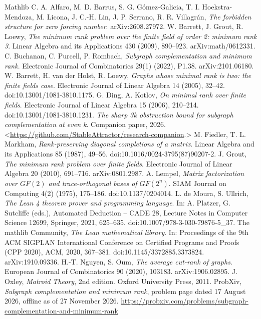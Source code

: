 \documentclass[11pt,letterpaper,reqno]{amsart}
\theoremstyle{spaced}
\begin{document}
\begin{thebibliography}{Mathlib}
\footnotesize\linespread{1}\selectfont\setlength{\itemsep}{0pt}\setlength{\parskip}{0pt}
 C. A. Alfaro, M. D. Barrus, S. G. Gómez-Galicia, T. I. Hoekstra-Mendoza, M. Licona, J. C.-H. Lin, J. P. Serrano, R. R. Villagrán, \emph{The forbidden structure for zero forcing number}. arXiv:2608.27972.
 W. Barrett, J. Grout, R. Loewy, \emph{The minimum rank problem over the finite field of order 2: minimum rank 3}. Linear Algebra and its Applications 430 (2009), 890--923. arXiv:math/0612331.
 C. Buchanan, C. Purcell, P. Rombach, \emph{Subgraph complementation and minimum rank}. Electronic Journal of Combinatorics 29(1) (2022), P1.38. arXiv:2101.06180.
 W. Barrett, H. van der Holst, R. Loewy, \emph{Graphs whose minimal rank is two: the finite fields case}. Electronic Journal of Linear Algebra 14 (2005), 32--42. doi:10.13001/1081-3810.1175.
 G. Ding, A. Kotlov, \emph{On minimal rank over finite fields}. Electronic Journal of Linear Algebra 15 (2006), 210--214. doi:10.13001/1081-3810.1231.
 \emph{The sharp 3k obstruction bound for subgraph complementation at even k}. Companion paper, 2026. \textless{}\url{https://github.com/StableAttractor/research-companion}.\textgreater{}
 M. Fiedler, T. L. Markham, \emph{Rank-preserving diagonal completions of a matrix}. Linear Algebra and its Applications 85 (1987), 49--56. doi:10.1016/0024-3795(87)90207-2.
 J. Grout, \emph{The minimum rank problem over finite fields}. Electronic Journal of Linear Algebra 20 (2010), 691--716. arXiv:0801.2987.
 A. Lempel, \emph{Matrix factorization over \(GF(2)\) and trace-orthogonal bases of \(GF(2^n)\)}. SIAM Journal on Computing 4(2) (1975), 175--186. doi:10.1137/0204014.
 L. de Moura, S. Ullrich, \emph{The Lean 4 theorem prover and programming language}. In: A. Platzer, G. Sutcliffe (eds.), Automated Deduction -- CADE 28, Lecture Notes in Computer Science 12699, Springer, 2021, 625--635. doi:10.1007/978-3-030-79876-5\_37.
 The mathlib Community, \emph{The Lean mathematical library}. In: Proceedings of the 9th ACM SIGPLAN International Conference on Certified Programs and Proofs (CPP 2020), ACM, 2020, 367--381. doi:10.1145/3372885.3373824. arXiv:1910.09336.
 H.-T. Nguyen, S. Oum, \emph{The average cut-rank of graphs}. European Journal of Combinatorics 90 (2020), 103183. arXiv:1906.02895.
 J. Oxley, \emph{Matroid Theory}, 2nd edition. Oxford University Press, 2011.
 ProbXiv, \emph{Subgraph complementation and minimum rank}, problem page dated 17 August 2026, offline as of 27 November 2026. \url{https://probxiv.com/problems/subgraph-complementation-and-minimum-rank}
\end{thebibliography}
\end{document}
